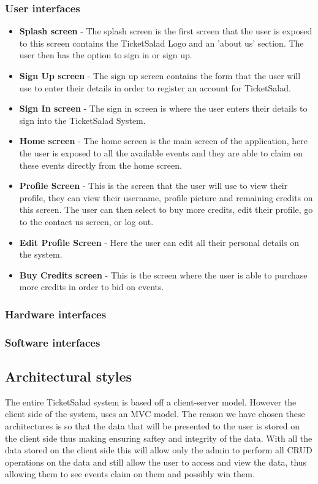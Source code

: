 \documentclass[11pt]{article}
\begin{document}
	\subsubsection{User interfaces}
	\begin{itemize} 
		\item \textbf{Splash screen} - The splash screen is the first screen that the user is exposed to this screen contains the TicketSalad Logo and an 'about us' section. The user then has the option to sign in or sign up.
		\item \textbf{Sign Up screen} - The sign up screen contains the form that the user will use to enter their details in order to register an account for TicketSalad. 
		\item \textbf{Sign In screen} - The sign in screen is where the user enters their details to sign into the TicketSalad System.
		\item \textbf{Home screen} - The home screen is the main screen of the application, here the user is exposed to all the available events and they are able to claim on these events directly from the home screen.
		\item \textbf{Profile Screen} - This is the screen that the user will use to view their profile, they can view their username, profile picture and remaining credits on this screen. The user can then select to buy more credits, edit their profile, go to the contact us screen, or log out.
		\item \textbf{Edit Profile Screen} - Here the user can edit all their personal details on the system.
		\item \textbf{Buy Credits screen} - This is the screen where the user is able to purchase more credits in order to bid on events.
	\end{itemize}
	\subsubsection{Hardware interfaces}
	\subsubsection{Software interfaces}
	\subsection{Architectural styles}
	The entire TicketSalad system is based off a client-server model. However the client side of the system, uses an MVC model. The reason we have chosen these architectures is so that the data that will be presented to the user is stored on the client side thus making ensuring saftey and integrity of the data. With all the data stored on the client side this will allow only the admin to perform all CRUD operations on the data and still allow the user to access and view the data, thus allowing them to see events claim on them and possibly win them.
	
\end{document}
